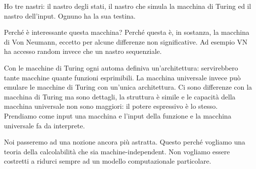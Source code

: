 Ho tre nastri: il nastro degli stati, il nastro che simula la macchina di Turing ed il nastro
dell'input. Ognuno ha la sua testina.

Perché è interessante questa macchina? Perché questa è, in sostanza, la macchina di Von Neumann,
eccetto per alcune differenze non significative. Ad esempio VN ha accesso random invece che un nastro
sequenziale.

Con le macchine di Turing ogni automa definiva un'architettura: servirebbero tante macchine quante
funzioni esprimibili. La macchina universale invece può emulare le macchine di Turing con un'unica
architettura. Ci sono differenze con la macchina di Turing ma sono dettagli, la struttura è simile e
le capacità della macchina universale non sono maggiori: il potere espressivo è lo stesso.
Prendiamo come input una macchina e l'input della funzione e la macchina universale fa da
interprete.

Noi passeremo ad una nozione ancora più astratta. Questo perché vogliamo una teoria della
calcolabilità che sia machine-independent. Non vogliamo essere costretti a ridurci sempre ad un
modello computazionale particolare.
